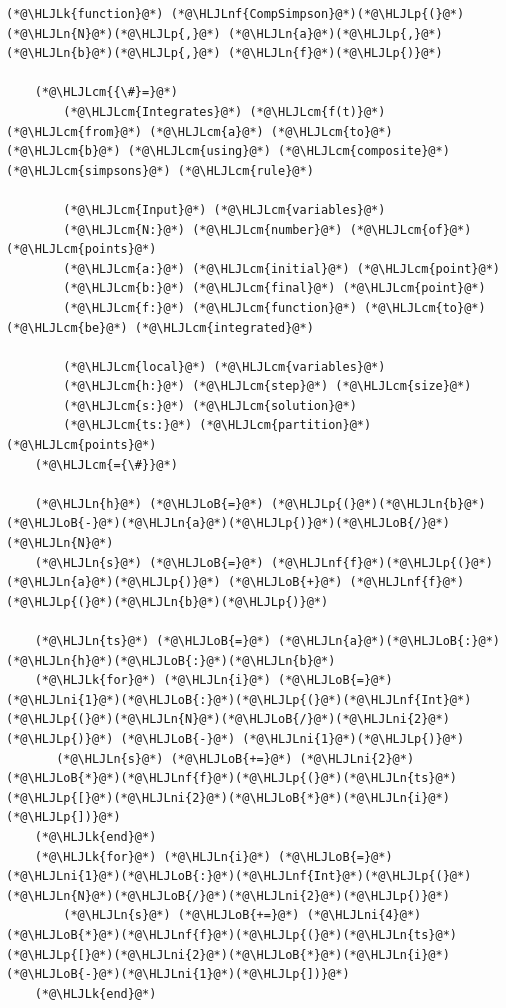 \documentclass[12pt,a4paper]{article}
\newcommand{\HLJLk}[1]{\textcolor[RGB]{148,91,176}{\textbf{#1}}}
\newcommand{\HLJLn}[1]{#1}
\newcommand{\HLJLnf}[1]{\textcolor[RGB]{66,102,213}{#1}}
\newcommand{\HLJLni}[1]{\textcolor[RGB]{59,151,46}{#1}}
\newcommand{\HLJLoB}[1]{\textcolor[RGB]{102,102,102}{\textbf{#1}}}
\newcommand{\HLJLp}[1]{#1}
\newcommand{\HLJLcm}[1]{\textcolor[RGB]{153,153,119}{\textit{#1}}}
\begin{document}
\begin{lstlisting}
(*@\HLJLk{function}@*) (*@\HLJLnf{CompSimpson}@*)(*@\HLJLp{(}@*)(*@\HLJLn{N}@*)(*@\HLJLp{,}@*) (*@\HLJLn{a}@*)(*@\HLJLp{,}@*) (*@\HLJLn{b}@*)(*@\HLJLp{,}@*) (*@\HLJLn{f}@*)(*@\HLJLp{)}@*)

    (*@\HLJLcm{{\#}=}@*)
        (*@\HLJLcm{Integrates}@*) (*@\HLJLcm{f(t)}@*) (*@\HLJLcm{from}@*) (*@\HLJLcm{a}@*) (*@\HLJLcm{to}@*) (*@\HLJLcm{b}@*) (*@\HLJLcm{using}@*) (*@\HLJLcm{composite}@*) (*@\HLJLcm{simpsons}@*) (*@\HLJLcm{rule}@*)

        (*@\HLJLcm{Input}@*) (*@\HLJLcm{variables}@*)
        (*@\HLJLcm{N:}@*) (*@\HLJLcm{number}@*) (*@\HLJLcm{of}@*) (*@\HLJLcm{points}@*)
        (*@\HLJLcm{a:}@*) (*@\HLJLcm{initial}@*) (*@\HLJLcm{point}@*)
        (*@\HLJLcm{b:}@*) (*@\HLJLcm{final}@*) (*@\HLJLcm{point}@*)
        (*@\HLJLcm{f:}@*) (*@\HLJLcm{function}@*) (*@\HLJLcm{to}@*) (*@\HLJLcm{be}@*) (*@\HLJLcm{integrated}@*)

        (*@\HLJLcm{local}@*) (*@\HLJLcm{variables}@*)
        (*@\HLJLcm{h:}@*) (*@\HLJLcm{step}@*) (*@\HLJLcm{size}@*)
        (*@\HLJLcm{s:}@*) (*@\HLJLcm{solution}@*)
        (*@\HLJLcm{ts:}@*) (*@\HLJLcm{partition}@*) (*@\HLJLcm{points}@*)
    (*@\HLJLcm{={\#}}@*)

    (*@\HLJLn{h}@*) (*@\HLJLoB{=}@*) (*@\HLJLp{(}@*)(*@\HLJLn{b}@*)(*@\HLJLoB{-}@*)(*@\HLJLn{a}@*)(*@\HLJLp{)}@*)(*@\HLJLoB{/}@*)(*@\HLJLn{N}@*)
    (*@\HLJLn{s}@*) (*@\HLJLoB{=}@*) (*@\HLJLnf{f}@*)(*@\HLJLp{(}@*)(*@\HLJLn{a}@*)(*@\HLJLp{)}@*) (*@\HLJLoB{+}@*) (*@\HLJLnf{f}@*)(*@\HLJLp{(}@*)(*@\HLJLn{b}@*)(*@\HLJLp{)}@*)

    (*@\HLJLn{ts}@*) (*@\HLJLoB{=}@*) (*@\HLJLn{a}@*)(*@\HLJLoB{:}@*)(*@\HLJLn{h}@*)(*@\HLJLoB{:}@*)(*@\HLJLn{b}@*)
    (*@\HLJLk{for}@*) (*@\HLJLn{i}@*) (*@\HLJLoB{=}@*) (*@\HLJLni{1}@*)(*@\HLJLoB{:}@*)(*@\HLJLp{(}@*)(*@\HLJLnf{Int}@*)(*@\HLJLp{(}@*)(*@\HLJLn{N}@*)(*@\HLJLoB{/}@*)(*@\HLJLni{2}@*)(*@\HLJLp{)}@*) (*@\HLJLoB{-}@*) (*@\HLJLni{1}@*)(*@\HLJLp{)}@*)
       (*@\HLJLn{s}@*) (*@\HLJLoB{+=}@*) (*@\HLJLni{2}@*)(*@\HLJLoB{*}@*)(*@\HLJLnf{f}@*)(*@\HLJLp{(}@*)(*@\HLJLn{ts}@*)(*@\HLJLp{[}@*)(*@\HLJLni{2}@*)(*@\HLJLoB{*}@*)(*@\HLJLn{i}@*)(*@\HLJLp{])}@*)
    (*@\HLJLk{end}@*)
    (*@\HLJLk{for}@*) (*@\HLJLn{i}@*) (*@\HLJLoB{=}@*) (*@\HLJLni{1}@*)(*@\HLJLoB{:}@*)(*@\HLJLnf{Int}@*)(*@\HLJLp{(}@*)(*@\HLJLn{N}@*)(*@\HLJLoB{/}@*)(*@\HLJLni{2}@*)(*@\HLJLp{)}@*)
        (*@\HLJLn{s}@*) (*@\HLJLoB{+=}@*) (*@\HLJLni{4}@*)(*@\HLJLoB{*}@*)(*@\HLJLnf{f}@*)(*@\HLJLp{(}@*)(*@\HLJLn{ts}@*)(*@\HLJLp{[}@*)(*@\HLJLni{2}@*)(*@\HLJLoB{*}@*)(*@\HLJLn{i}@*)(*@\HLJLoB{-}@*)(*@\HLJLni{1}@*)(*@\HLJLp{])}@*)
    (*@\HLJLk{end}@*)


\end{lstlisting}
\end{document}
